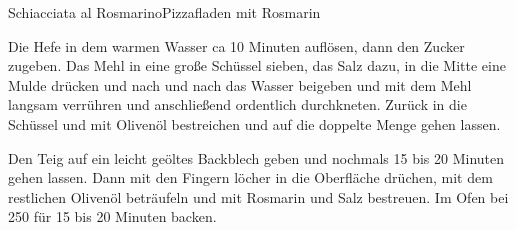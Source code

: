 \begin{recipe}{Schiacciata al Rosmarino}{Pizzafladen mit Rosmarin}
  \label{Schiacciata al Rosmarino}
  \inglist

  \steps
Die Hefe in dem warmen Wasser ca 10 Minuten auflösen, dann den Zucker zugeben. Das Mehl
  in eine große Schüssel sieben, das Salz dazu, in die Mitte eine Mulde drücken und nach
  und nach das Wasser beigeben und mit dem Mehl langsam verrühren und anschließend
  ordentlich durchkneten. Zurück in die Schüssel und mit Olivenöl bestreichen und auf die
	doppelte Menge gehen lassen.

Den Teig auf ein leicht geöltes Backblech geben und nochmals 15 bis 20 Minuten gehen
  lassen. Dann mit den Fingern löcher in die Oberfläche drüchen, mit dem restlichen
  Olivenöl beträufeln und mit Rosmarin und Salz bestreuen. Im Ofen bei 250 \celsius für
	15 bis 20 Minuten backen.
\end{recipe}
